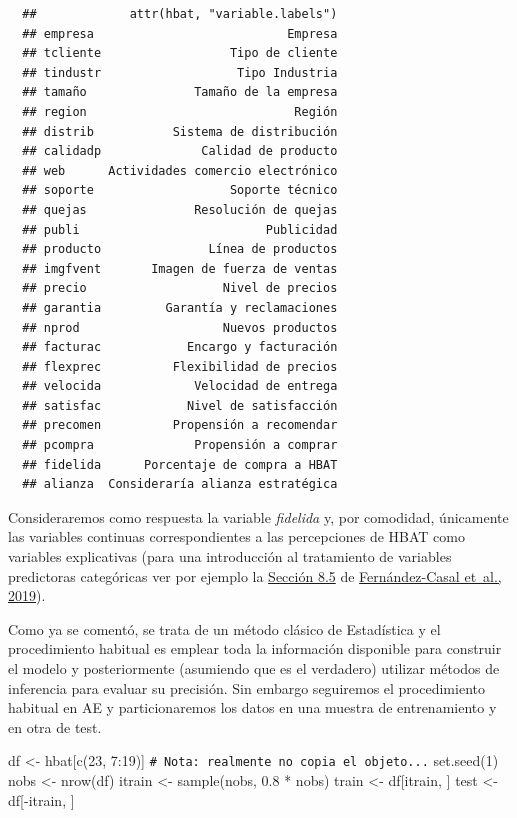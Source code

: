 \documentclass[
]{book}
\newenvironment{Shaded}{\begin{snugshade}}{\end{snugshade}}
\newcommand{\CommentTok}[1]{\textcolor[rgb]{0.56,0.35,0.01}{\textit{#1}}}
\newcommand{\DecValTok}[1]{\textcolor[rgb]{0.00,0.00,0.81}{#1}}
\newcommand{\FloatTok}[1]{\textcolor[rgb]{0.00,0.00,0.81}{#1}}
\newcommand{\FunctionTok}[1]{\textcolor[rgb]{0.00,0.00,0.00}{#1}}
\newcommand{\NormalTok}[1]{#1}
\newcommand{\OtherTok}[1]{\textcolor[rgb]{0.56,0.35,0.01}{#1}}
\newcommand{\SpecialCharTok}[1]{\textcolor[rgb]{0.00,0.00,0.00}{#1}}
\theoremstyle{break}
\theoremstyle{nonumberplain}
\renewcommand{\CommentTok}[1]{\textcolor[rgb]{0.41,0.41,0.41}{\texttt{#1}}}
\begin{document}
\begin{verbatim}
  ##             attr(hbat, "variable.labels")
  ## empresa                           Empresa
  ## tcliente                  Tipo de cliente
  ## tindustr                   Tipo Industria
  ## tamaño               Tamaño de la empresa
  ## region                             Región
  ## distrib           Sistema de distribución
  ## calidadp              Calidad de producto
  ## web      Actividades comercio electrónico
  ## soporte                   Soporte técnico
  ## quejas               Resolución de quejas
  ## publi                          Publicidad
  ## producto               Línea de productos
  ## imgfvent       Imagen de fuerza de ventas
  ## precio                   Nivel de precios
  ## garantia         Garantía y reclamaciones
  ## nprod                    Nuevos productos
  ## facturac            Encargo y facturación
  ## flexprec          Flexibilidad de precios
  ## velocida             Velocidad de entrega
  ## satisfac            Nivel de satisfacción
  ## precomen          Propensión a recomendar
  ## pcompra              Propensión a comprar
  ## fidelida      Porcentaje de compra a HBAT
  ## alianza  Consideraría alianza estratégica
\end{verbatim}

Consideraremos como respuesta la variable \emph{fidelida} y, por comodidad, únicamente las variables continuas correspondientes a las percepciones de HBAT como variables explicativas (para una introducción al tratamiento de variables predictoras categóricas ver por ejemplo la \href{https://rubenfcasal.github.io/intror/modelos-lineales.html\#regresion-con-variables-categoricas}{Sección 8.5} de \protect\hyperlink{ref-fernandez2019intror}{Fernández-Casal et~al., 2019}).

Como ya se comentó, se trata de un método clásico de Estadística y el procedimiento habitual es emplear toda la información disponible para construir el modelo y posteriormente (asumiendo que es el verdadero) utilizar métodos de inferencia para evaluar su precisión.
Sin embargo seguiremos el procedimiento habitual en AE y particionaremos los datos en una muestra de entrenamiento y en otra de test.

\begin{Shaded}
\begin{Highlighting}[]
\NormalTok{df }\OtherTok{\textless{}{-}}\NormalTok{ hbat[}\FunctionTok{c}\NormalTok{(}\DecValTok{23}\NormalTok{, }\DecValTok{7}\SpecialCharTok{:}\DecValTok{19}\NormalTok{)]  }\CommentTok{\# Nota: realmente no copia el objeto...}
\FunctionTok{set.seed}\NormalTok{(}\DecValTok{1}\NormalTok{)}
\NormalTok{nobs }\OtherTok{\textless{}{-}} \FunctionTok{nrow}\NormalTok{(df)}
\NormalTok{itrain }\OtherTok{\textless{}{-}} \FunctionTok{sample}\NormalTok{(nobs, }\FloatTok{0.8} \SpecialCharTok{*}\NormalTok{ nobs)}
\NormalTok{train }\OtherTok{\textless{}{-}}\NormalTok{ df[itrain, ]}
\NormalTok{test }\OtherTok{\textless{}{-}}\NormalTok{ df[}\SpecialCharTok{{-}}\NormalTok{itrain, ]}
\end{Highlighting}
\end{Shaded}
\end{document}

